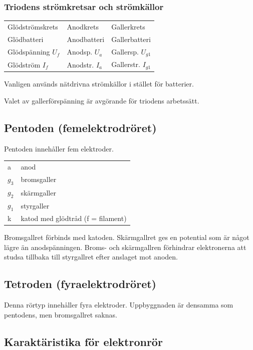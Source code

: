 \subsubsection{Triodens strömkretsar och strömkällor}

\begin{tabular}{lll}
Glödströmskrets      & Anodkrets        &  Gallerkrets \\
Glödbatteri          & Anodbatteri      &  Gallerbatteri \\
Glödspänning \(U_f\) & Anodsp. \(U_a\)  &  Gallersp. \(U_{g1}\) \\
Glödström \(I_f\)    & Anodstr. \(I_a\) &  Gallerstr. \(I_{g1}\) \\
\end{tabular}

Vanligen används nätdrivna strömkällor i stället för batterier.

Valet av gallerförspänning är avgörande för triodens arbetssätt.

\subsection{Pentoden (femelektrodröret)}

Pentoden innehåller fem elektroder.

\begin{tabular}{ll}
  a       & anod \\
  \(g_3\) & bromsgaller \\
  \(g_2\) & skärmgaller \\
  \(g_1\) & styrgaller \\
  k      & katod med glödtråd (f = filament) \\
\end{tabular}

Bromsgallret förbinds med katoden. Skärmgallret ges en potential som är något
lägre än anodspänningen.
Broms- och skärmgallren förhindrar elektronerna att studsa tillbaka till
styrgallret efter anslaget mot anoden.


\subsection{Tetroden (fyraelektrodröret)}

Denna rörtyp innehåller fyra elektroder. Uppbyggnaden är densamma som pentodens,
men bromsgallret saknas.

\subsection{Karaktäristika för elektronrör}

